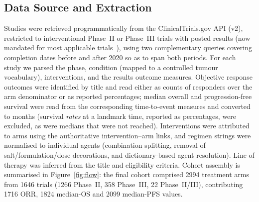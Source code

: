 \documentclass[cancers,article,submit,pdftex,moreauthors]{Definitions/mdpi}
\begin{document}
\subsection{Data Source and Extraction}
Studies were retrieved programmatically from the ClinicalTrials.gov API (v2),
restricted to interventional Phase~II or Phase~III trials with posted results (now
mandated for most applicable trials~\cite{zarin2016}), using two complementary
queries covering completion dates before and after 2020 so as to span both periods.
For each study we parsed the phase, condition (mapped to a controlled tumour
vocabulary), interventions, and the results outcome measures. Objective response
outcomes were identified by title and read either as counts of responders over the
arm denominator or as reported percentages; median overall and progression-free
survival were read from the corresponding time-to-event measures and converted to
months (survival \emph{rates} at a landmark time, reported as percentages, were
excluded, as were medians that were not reached). Interventions were attributed to
arms using the authoritative intervention--arm links, and regimen strings were
normalised to individual agents (combination splitting, removal of
salt/formulation/dose decorations, and dictionary-based agent resolution). Line of
therapy was inferred from the title and eligibility criteria. Cohort assembly is
summarised in Figure~\ref{fig:flow}: the final cohort comprised \num{2994} treatment
arms from \num{1646} trials (\num{1266} Phase~II, \num{358} Phase~III, \num{22}
Phase~II/III), contributing \num{1716} ORR, \num{1824} median-OS and \num{2099}
median-PFS values.
\end{document}
